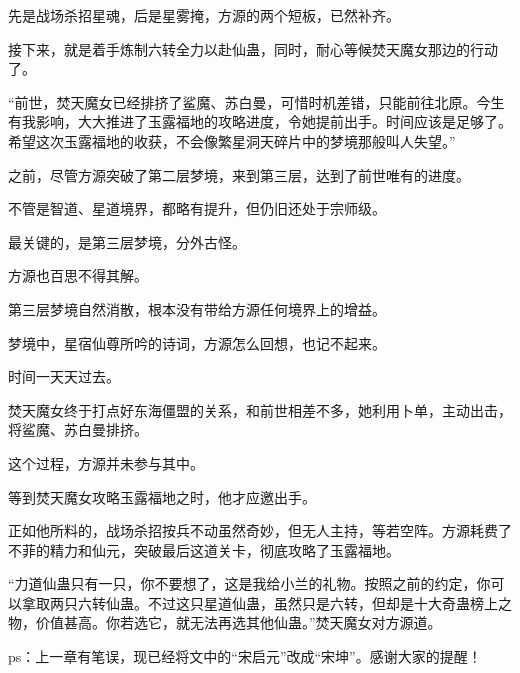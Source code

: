 \begin{this_body}
先是战场杀招星魂，后是星雾掩，方源的两个短板，已然补齐。

接下来，就是着手炼制六转全力以赴仙蛊，同时，耐心等候焚天魔女那边的行动了。

“前世，焚天魔女已经排挤了鲨魔、苏白曼，可惜时机差错，只能前往北原。今生有我影响，大大推进了玉露福地的攻略进度，令她提前出手。时间应该是足够了。希望这次玉露福地的收获，不会像繁星洞天碎片中的梦境那般叫人失望。”

之前，尽管方源突破了第二层梦境，来到第三层，达到了前世唯有的进度。

不管是智道、星道境界，都略有提升，但仍旧还处于宗师级。

最关键的，是第三层梦境，分外古怪。

方源也百思不得其解。

第三层梦境自然消散，根本没有带给方源任何境界上的增益。

梦境中，星宿仙尊所吟的诗词，方源怎么回想，也记不起来。

时间一天天过去。

焚天魔女终于打点好东海僵盟的关系，和前世相差不多，她利用卜单，主动出击，将鲨魔、苏白曼排挤。

这个过程，方源并未参与其中。

等到焚天魔女攻略玉露福地之时，他才应邀出手。

正如他所料的，战场杀招按兵不动虽然奇妙，但无人主持，等若空阵。方源耗费了不菲的精力和仙元，突破最后这道关卡，彻底攻略了玉露福地。

“力道仙蛊只有一只，你不要想了，这是我给小兰的礼物。按照之前的约定，你可以拿取两只六转仙蛊。不过这只星道仙蛊，虽然只是六转，但却是十大奇蛊榜上之物，价值甚高。你若选它，就无法再选其他仙蛊。”焚天魔女对方源道。

ps：上一章有笔误，现已经将文中的“宋启元”改成“宋坤”。感谢大家的提醒！

\end{this_body}

